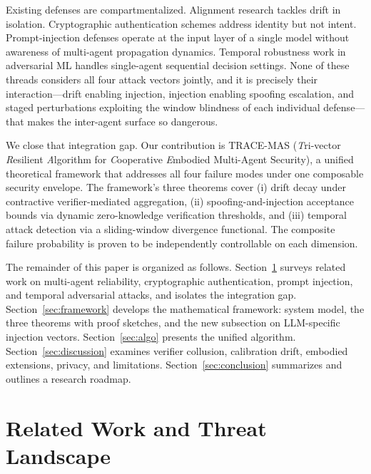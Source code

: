 \documentclass[conference]{IEEEtran}
\begin{document}
Existing defenses are compartmentalized. Alignment research tackles drift
in isolation. Cryptographic authentication schemes address identity but
not intent. Prompt-injection defenses operate at the input layer of a
single model without awareness of multi-agent propagation dynamics.
Temporal robustness work in adversarial ML handles single-agent sequential
decision settings. None of these threads considers all four attack vectors
jointly, and it is precisely their interaction---drift enabling injection,
injection enabling spoofing escalation, and staged perturbations exploiting
the window blindness of each individual defense---that makes the
inter-agent surface so dangerous.

We close that integration gap. Our contribution is \textsc{TRACE-MAS}
(\emph{T}ri-vector \emph{R}esilient \emph{A}lgorithm for \emph{C}ooperative
\emph{E}mbodied Multi-Agent Security), a unified theoretical framework that
addresses all four failure modes under one composable security envelope.
The framework's three theorems cover (i) drift decay under contractive
verifier-mediated aggregation, (ii) spoofing-and-injection acceptance
bounds via dynamic zero-knowledge verification thresholds, and
(iii) temporal attack detection via a sliding-window divergence functional.
The composite failure probability is proven to be independently controllable
on each dimension.

The remainder of this paper is organized as follows.
Section~\ref{sec:related} surveys related work on multi-agent reliability,
cryptographic authentication, prompt injection, and temporal adversarial
attacks, and isolates the integration gap.
Section~\ref{sec:framework} develops the mathematical framework:
system model, the three theorems with proof sketches, and the new subsection
on LLM-specific injection vectors.
Section~\ref{sec:algo} presents the unified algorithm.
Section~\ref{sec:discussion} examines verifier collusion, calibration
drift, embodied extensions, privacy, and limitations.
Section~\ref{sec:conclusion} summarizes and outlines a research roadmap.

\section{Related Work and Threat Landscape}
\label{sec:related}
\end{document}
